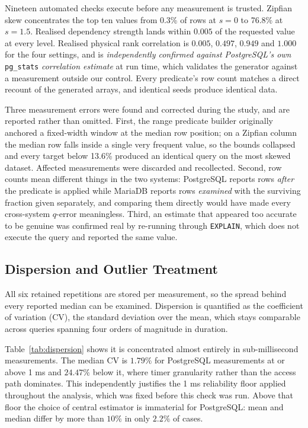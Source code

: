 \documentclass[12pt, a4paper]{article}
\begin{document}
Nineteen automated checks execute before any measurement is trusted.
Zipfian skew concentrates the top ten values from 0.3\% of rows at
$s = 0$ to 76.8\% at $s = 1.5$. Realised dependency strength lands
within $0.005$ of the requested value at every level. Realised physical
rank correlation is $0.005$, $0.497$, $0.949$ and $1.000$ for the four
settings, and is \emph{independently confirmed against PostgreSQL's own}
\texttt{pg\_stats} \emph{correlation estimate} at run time, which
validates the generator against a measurement outside our control. Every
predicate's row count matches a direct recount of the generated arrays,
and identical seeds produce identical data.

Three measurement errors were found and corrected during the study, and
are reported rather than omitted. First, the range predicate builder
originally anchored a fixed-width window at the median row position; on
a Zipfian column the median row falls inside a single very frequent
value, so the bounds collapsed and every target below 13.6\% produced an
identical query on the most skewed dataset. Affected measurements were
discarded and recollected. Second, row counts mean different things in
the two systems: PostgreSQL reports rows \emph{after} the predicate is
applied while MariaDB reports rows \emph{examined} with the surviving
fraction given separately, and comparing them directly would have made
every cross-system $q$-error meaningless. Third, an estimate that
appeared too accurate to be genuine was confirmed real by re-running
through \texttt{EXPLAIN}, which does not execute the query and reported
the same value.

\subsection{Dispersion and Outlier Treatment}
\label{sec:dispersion}

All six retained repetitions are stored per measurement, so the spread
behind every reported median can be examined. Dispersion is quantified
as the coefficient of variation (CV), the standard deviation over the
mean, which stays comparable across queries spanning four orders of
magnitude in duration.

Table~\ref{tab:dispersion} shows it is concentrated almost entirely in
sub-millisecond measurements. The median CV is $1.79\%$ for PostgreSQL
measurements at or above 1 ms and $24.47\%$ below it, where timer
granularity rather than the access path dominates. This independently
justifies the 1 ms reliability floor applied throughout the analysis,
which was fixed before this check was run. Above that floor the choice
of central estimator is immaterial for PostgreSQL: mean and median
differ by more than $10\%$ in only $2.2\%$ of cases.
\end{document}
